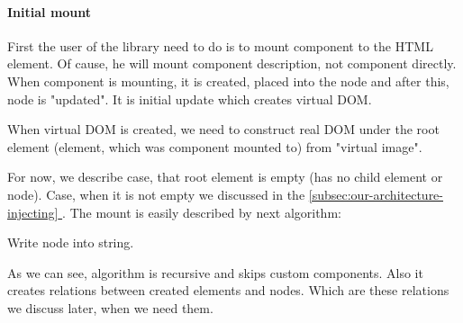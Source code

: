\documentclass[oneside, 12pt]{book}
\newcommand*{\fullref}[1]{\hyperref[{#1}]{\autoref*{#1} \nameref*{#1}}}
\begin{document}
      \paragraph{Initial mount}\label{par:our-architecture-rendering-browser-init} 
        First the user of the library need to do is to mount component to the HTML element. 
        Of cause, he will mount component description, not component directly.
        When component is mounting, it is created, placed into the node and after this, node is "updated". 
        It is initial update which creates virtual DOM. 

        When virtual DOM is created, we need to construct real DOM under the root element 
        (element, which was component mounted to) from "virtual image".

        For now, we describe case, that root element is empty (has no child element or node).
        Case, when it is not empty we discussed in the \fullref{subsec:our-architecture-injecting}.
        The mount is easily described by next algorithm:
        \begin{algorithm}[H]
          \caption{Write node into string.}
        \end{algorithm}

        As we can see, algorithm is recursive and skips custom components. 
        Also it creates relations between created elements and nodes. 
        Which are these relations we discuss later, when we need them.
\end{document}
